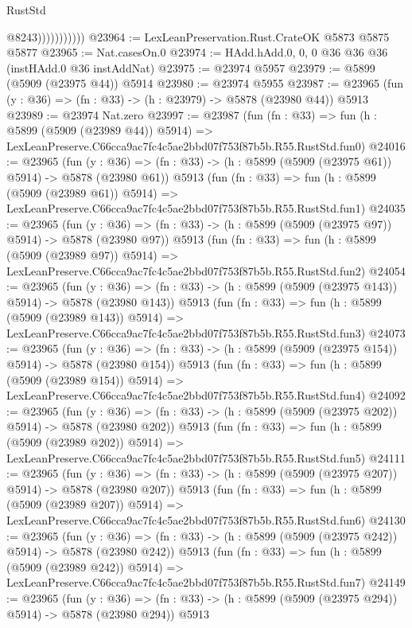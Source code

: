\begin{lexlean}{RustStd}
\begin{coremodule}
{{                          @8243)))))))))))
@23964 := LexLeanPreservation.Rust.CrateOK @5873 @5875 @5877
@23965 := Nat.casesOn.{0}
@23974 := HAdd.hAdd.{0, 0, 0} @36 @36 @36 (instHAdd.{0} @36 instAddNat)
@23975 := @23974 @5957
@23979 := @5899 (@5909 (@23975 @44)) @5914
@23980 := @23974 @5955
@23987 := @23965 (fun (y : @36) => (fn : @33) -> (h : @23979) -> @5878 (@23980 @44)) @5913
@23989 := @23974 Nat.zero
@23997 := @23987
    (fun (fn : @33) =>
    fun (h : @5899 (@5909 (@23989 @44)) @5914) =>
    LexLeanPreserve.C66cca9ac7fc4c5ae2bbd07f753f87b5b.R55.RustStd.fun0)
@24016 := @23965
    (fun (y : @36) => (fn : @33) -> (h : @5899 (@5909 (@23975 @61)) @5914) -> @5878 (@23980 @61))
    @5913
    (fun (fn : @33) =>
    fun (h : @5899 (@5909 (@23989 @61)) @5914) =>
    LexLeanPreserve.C66cca9ac7fc4c5ae2bbd07f753f87b5b.R55.RustStd.fun1)
@24035 := @23965
    (fun (y : @36) => (fn : @33) -> (h : @5899 (@5909 (@23975 @97)) @5914) -> @5878 (@23980 @97))
    @5913
    (fun (fn : @33) =>
    fun (h : @5899 (@5909 (@23989 @97)) @5914) =>
    LexLeanPreserve.C66cca9ac7fc4c5ae2bbd07f753f87b5b.R55.RustStd.fun2)
@24054 := @23965
    (fun (y : @36) => (fn : @33) -> (h : @5899 (@5909 (@23975 @143)) @5914) -> @5878 (@23980 @143))
    @5913
    (fun (fn : @33) =>
    fun (h : @5899 (@5909 (@23989 @143)) @5914) =>
    LexLeanPreserve.C66cca9ac7fc4c5ae2bbd07f753f87b5b.R55.RustStd.fun3)
@24073 := @23965
    (fun (y : @36) => (fn : @33) -> (h : @5899 (@5909 (@23975 @154)) @5914) -> @5878 (@23980 @154))
    @5913
    (fun (fn : @33) =>
    fun (h : @5899 (@5909 (@23989 @154)) @5914) =>
    LexLeanPreserve.C66cca9ac7fc4c5ae2bbd07f753f87b5b.R55.RustStd.fun4)
@24092 := @23965
    (fun (y : @36) => (fn : @33) -> (h : @5899 (@5909 (@23975 @202)) @5914) -> @5878 (@23980 @202))
    @5913
    (fun (fn : @33) =>
    fun (h : @5899 (@5909 (@23989 @202)) @5914) =>
    LexLeanPreserve.C66cca9ac7fc4c5ae2bbd07f753f87b5b.R55.RustStd.fun5)
@24111 := @23965
    (fun (y : @36) => (fn : @33) -> (h : @5899 (@5909 (@23975 @207)) @5914) -> @5878 (@23980 @207))
    @5913
    (fun (fn : @33) =>
    fun (h : @5899 (@5909 (@23989 @207)) @5914) =>
    LexLeanPreserve.C66cca9ac7fc4c5ae2bbd07f753f87b5b.R55.RustStd.fun6)
@24130 := @23965
    (fun (y : @36) => (fn : @33) -> (h : @5899 (@5909 (@23975 @242)) @5914) -> @5878 (@23980 @242))
    @5913
    (fun (fn : @33) =>
    fun (h : @5899 (@5909 (@23989 @242)) @5914) =>
    LexLeanPreserve.C66cca9ac7fc4c5ae2bbd07f753f87b5b.R55.RustStd.fun7)
@24149 := @23965
    (fun (y : @36) => (fn : @33) -> (h : @5899 (@5909 (@23975 @294)) @5914) -> @5878 (@23980 @294))
    @5913
}}
\end{coremodule}
\end{lexlean}
